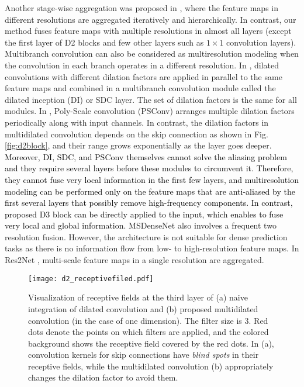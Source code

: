 \documentclass[final]{cvpr}
\def\NEW#1{\textcolor{black}{#1}}
\begin{document}
Another stage-wise aggregation was proposed in \cite{Yu18}, where the feature maps in different resolutions are aggregated iteratively and hierarchically.
In contrast, our method fuses feature maps with multiple resolutions in almost all layers (except the first layer of D2 blocks and few other layers such as $1\times1$ convolution layers).
Multibranch convolution can also be considered as multiresolution modeling when the convolution in each branch operates in a different resolution. In \cite{Shi2017DilatedInception,Chen2017DeepLab,Yang2020DilatedInception,Schuster19}, dilated convolutions with different dilation factors are applied in parallel to the same feature maps and combined in a multibranch convolution module called the dilated inception (DI) or SDC layer. The set of dilation factors is the same for all modules. 
In \cite{Li20PSConv}, Poly-Scale convolution (PSConv) arranges multiple dilation factors periodically along with input channels.
In contrast, the dilation factors in multidilated convolution depends on the skip connection as shown in Fig. \ref{fig:d2block}, and their range grows exponentially as the layer goes deeper.
\NEW{Moreover, DI, SDC, and PSConv themselves cannot solve the aliasing problem and they require several layers before these modules to circumvent it. Therefore, they cannot fuse very local information in the first few layers, and multiresolution modeling can be performed only on the feature maps that are anti-aliased by the first several layers that possibly remove high-frequency components. In contrast, proposed D3 block can be directly applied to the input, which enables to fuse very local and global information.
}
MSDenseNet \cite{Huang18MSDense} also involves a frequent two resolution fusion. However, the architecture is not suitable for dense prediction tasks as there is no information flow from low- to high-resolution feature maps.  In Res2Net \cite{Gao21Res2Net}, multi-scale feature maps in a single resolution are aggregated.

    

\begin{figure}[t]
  \centering
  \texttt{[image: d2\_receptivefiled.pdf]}
  \caption{Visualization of receptive fields at the third layer of (a) naive integration of dilated convolution and (b) proposed multidilated convolution (in the case of one dimension). The filter size is 3. Red dots denote the points on which filters are applied, and the colored background shows the receptive field covered by the red dots. In (a), convolution kernels for skip connections have \textit{blind spots} in their receptive fields, while the multidilated convolution (b) appropriately changes the dilation factor to avoid them.}
  \label{fig:d2rf}
\end{figure}
\end{document}
